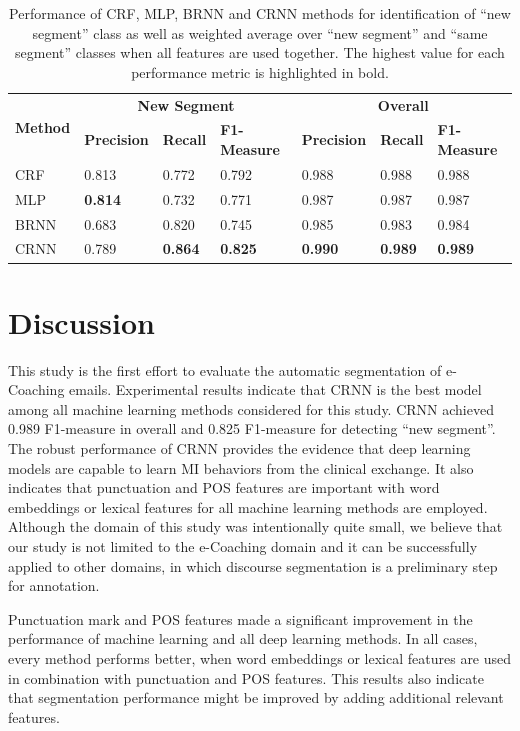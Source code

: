 \documentclass{amia}
\begin{document}
\begin{table}[ht]
\centering
\caption{Performance of CRF, MLP, BRNN and CRNN methods for identification of ``new segment'' class as well as weighted average over ``new segment'' and ``same segment'' classes when all features are used together. The highest value for each performance metric
is highlighted in bold.}
\label{tab:result_weighted_avg}
 \begin{tabular}{|l|l|l|l|l|l|l|}
  \hline
   \multirow{2}{*}{\textbf{Method}} & \multicolumn{3}{|c|}{\textbf{New Segment}} & \multicolumn{3}{|c|}{\textbf{Overall}} \\\cline{2-7}
   & \textbf{Precision}  & \textbf{Recall} & \textbf{F1-Measure} & \textbf{Precision}  & \textbf{Recall} & \textbf{F1-Measure} \\ \hline    
 CRF & 0.813 & 0.772 & 0.792 & 0.988 & 0.988 & 0.988 \\ \hline
 MLP & \textbf{0.814} & 0.732 & 0.771 & 0.987 & 0.987 & 0.987 \\ \hline
 BRNN & 0.683 & 0.820 & 0.745 & 0.985 & 0.983 & 0.984 \\ \hline
 CRNN & 0.789 & \textbf{0.864} & \textbf{0.825} & \textbf{0.990} & \textbf{0.989} & \textbf{0.989} \\ \hline
  \end{tabular}
\end{table}              

\section*{Discussion}
This study is the first effort to evaluate the automatic segmentation of e-Coaching emails. Experimental results indicate that CRNN is the best model among all machine learning methods considered for this study. CRNN achieved 0.989 F1-measure in overall and 0.825 F1-measure for detecting ``new segment''. The robust performance of CRNN provides the evidence that deep learning models are capable to learn MI behaviors from the clinical exchange. It also indicates that punctuation and POS features are important with word embeddings or lexical features for all machine learning methods are employed. Although the domain of this study was intentionally quite small, we believe that our study is not limited to the e-Coaching domain and it can be successfully applied to other domains, in which discourse segmentation is a preliminary step for annotation.

Punctuation mark and POS features made a significant improvement in the performance of machine learning and all deep learning methods. In all cases, every method performs better, when word embeddings or lexical features are used in combination with punctuation and POS features. This results also indicate that segmentation performance might be improved by adding additional relevant features. 
\end{document}
